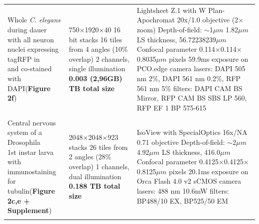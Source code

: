 \documentclass[]{spie}  %
\begin{document}
\begin{landscape}
{\begin{longtable}{lll}
                              \makecell[l]{Whole \emph{C. elegans} during dauer \\with all neuron nuclei expressing tagRFP in \\and co-stained with DAPI(\textbf{Figure 2f})} &  \makecell[l]{750$\times$1920$\times$40 16 bit stacks\\16 tiles from 4 angles (10\% overlap) \\2 channels, single illumination\\\textbf{0.003 (2,96GB) TB total size}}  &  \makecell[l]{Lightsheet Z.1 with W Plan-Apochromat 20x/1.0 objective (2$\times$ zoom)\\ Depth-of-field: $\sim$1$\mu{}m$\\1.82$\mu{}m$ LS thickness, 56.72238239$\mu{}m$ Confocal parameter\\0.114$\times$0.114$\times$0.8035$\mu{}m$ pixels\\59.9ms exposure on PCO.edge camera\\lasers: DAPI 505 nm 2\%, DAPI 561 nm 0.2\%, RFP 561 nm 5\%\\filters: DAPI CAM BS Mirror, RFP CAM BS SBS LP 560, RFP EF 1 BP 575-615} \\ \\
                          \makecell[l]{Central nervous system of a Drosophila\\ 1st instar larva with immunostaining \\for tubulin(\textbf{Figure 2c,e + Supplement})} &                     \makecell[l]{2048$\times$2048$\times$923 stacks\\26 tiles from 2 angles (28\% overlap) \\1 channels, dual illumination\\\textbf{0.188 TB total size}}  &                                                                                                                \makecell[l]{IsoView with SpecialOptics 16x/NA 0.71 objective\\ Depth-of-field: $\sim$2$\mu{}m$ \\4.92$\mu{}m$ LS thickness, 416.0$\mu{}m$ Confocal parameter\\0.4125$\times$0.4125$\times$0.8125$\mu{}m$ pixels\\20.1ms exposure on Orca Flash 4.0 v2 sCMOS camera\\lasers: 488 nm 10.6mW\\filters: BP488/10 EX, BP525/50 EM } \\ \\


\end{longtable}}
\end{landscape}
\end{document}
